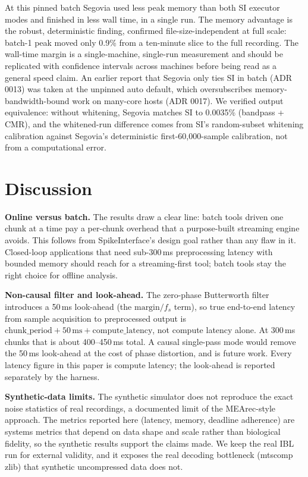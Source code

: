 \documentclass[11pt]{article}
\begin{document}
At this pinned batch Segovia used less peak memory than both SI executor modes and finished in less
wall time, in a single run. The memory advantage is the robust, deterministic finding, confirmed
file-size-independent at full scale: batch-1 peak moved only 0.9\% from a ten-minute slice to the full
recording. The wall-time margin is a single-machine, single-run measurement and should be replicated
with confidence intervals across machines before being read as a general speed claim. An earlier report
that Segovia only ties SI in batch (ADR 0013) was taken at the unpinned auto default, which
oversubscribes memory-bandwidth-bound work on many-core hosts (ADR 0017). We verified output
equivalence: without whitening, Segovia matches SI to 0.0035\% (bandpass + CMR), and the whitened-run
difference comes from SI's random-subset whitening calibration against Segovia's deterministic
first-60{,}000-sample calibration, not from a computational error.

\section{Discussion}

\textbf{Online versus batch.} The results draw a clear line: batch tools driven one chunk at a time pay
a per-chunk overhead that a purpose-built streaming engine avoids. This follows from SpikeInterface's
design goal rather than any flaw in it. Closed-loop applications that need sub-300\,ms preprocessing
latency with bounded memory should reach for a streaming-first tool; batch tools stay the right choice
for offline analysis.

\textbf{Non-causal filter and look-ahead.} The zero-phase Butterworth filter introduces a 50\,ms
look-ahead (the $\text{margin} / f_s$ term), so true end-to-end latency from sample acquisition to
preprocessed output is $\text{chunk\_period} + 50\,\text{ms} + \text{compute\_latency}$, not compute
latency alone. At 300\,ms chunks that is about 400--450\,ms total. A causal single-pass mode would
remove the 50\,ms look-ahead at the cost of phase distortion, and is future work. Every latency figure
in this paper is compute latency; the look-ahead is reported separately by the harness.

\textbf{Synthetic-data limits.} The synthetic simulator does not reproduce the exact noise statistics
of real recordings, a documented limit of the MEArec-style approach. The metrics reported here
(latency, memory, deadline adherence) are systems metrics that depend on data shape and scale rather
than biological fidelity, so the synthetic results support the claims made. We keep the real IBL run
for external validity, and it exposes the real decoding bottleneck (mtscomp zlib) that synthetic
uncompressed data does not.
\end{document}
